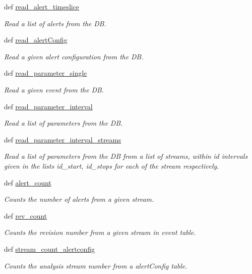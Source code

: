\begin{DoxyCompactItemize}
def \hyperlink{namespaceamonpy_1_1dbase_1_1db__read_a5b9cc348ea38bff43d6d2798e33a6c50}{read\-\_\-alert\-\_\-timeslice}
\begin{DoxyCompactList}\small\item\em Read a list of alerts from the D\-B. \end{DoxyCompactList}\item 
def \hyperlink{namespaceamonpy_1_1dbase_1_1db__read_ac6c02b3b64cf22309d7ab92ec7aa64e8}{read\-\_\-alert\-Config}
\begin{DoxyCompactList}\small\item\em Read a given alert configuration from the D\-B. \end{DoxyCompactList}\item 
def \hyperlink{namespaceamonpy_1_1dbase_1_1db__read_af44cf8f28c8cb5c845fab0667f035770}{read\-\_\-parameter\-\_\-single}
\begin{DoxyCompactList}\small\item\em Read a given event from the D\-B. \end{DoxyCompactList}\item 
def \hyperlink{namespaceamonpy_1_1dbase_1_1db__read_aeb91007cbf02a072b256bc02dd59b1fd}{read\-\_\-parameter\-\_\-interval}
\begin{DoxyCompactList}\small\item\em Read a list of parameters from the D\-B. \end{DoxyCompactList}\item 
def \hyperlink{namespaceamonpy_1_1dbase_1_1db__read_a9ea1ff5e9c081631e6df34550a8005f0}{read\-\_\-parameter\-\_\-interval\-\_\-streams}
\begin{DoxyCompactList}\small\item\em Read a list of parameters from the D\-B from a list of streams, within id intervals given in the lists id\-\_\-start, id\-\_\-stops for each of the stream respectively. \end{DoxyCompactList}\item 
def \hyperlink{namespaceamonpy_1_1dbase_1_1db__read_a043531a3ecc1db0de4824643e6a48e51}{alert\-\_\-count}
\begin{DoxyCompactList}\small\item\em Counts the number of alerts from a given stream. \end{DoxyCompactList}\item 
def \hyperlink{namespaceamonpy_1_1dbase_1_1db__read_ad56e9c199b78bc3ef94eb071f6a6c45c}{rev\-\_\-count}
\begin{DoxyCompactList}\small\item\em Counts the revision number from a given stream in event table. \end{DoxyCompactList}\item 
def \hyperlink{namespaceamonpy_1_1dbase_1_1db__read_a7650619e7c136d6b86feced068f6d334}{stream\-\_\-count\-\_\-alertconfig}
\begin{DoxyCompactList}\small\item\em Counts the analysis stream number from a alert\-Config table. \end{DoxyCompactList}\end{DoxyCompactItemize}


